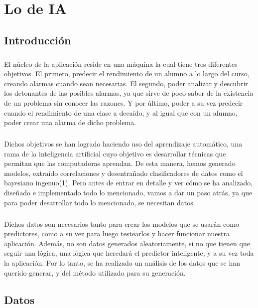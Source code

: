 \chapter{Lo de IA}

\section{Introducción}
\paragraph{}
El núcleo de la aplicación reside en una máquina la cual tiene tres
diferentes objetivos. El primero, predecir el rendimiento de un alumno
a lo largo del curso, creando alarmas cuando sean necesarias. El
segundo, poder analizar y descubrir los detonantes de las posibles
alarmas, ya que sirve de poco saber de la existencia de un problema
sin conocer las razones. Y por último, poder a su vez predecir cuando
el rendimiento de una clase a decaído, y al igual que con un alumno,
poder crear una alarma de dicho problema.
\paragraph{}
Dichos objetivos se han logrado haciendo uso del aprendizaje
automático, una rama de la inteligencia artificial cuyo objetivo es
desarrollar técnicas que permitan que las computadoras aprendan. De
esta manera, hemos generado modelos, extraído correlaciones y
desentrañado clasificadores de datos como el bayesiano
ingenuo(1). Pero antes de entrar en detalle y ver cómo se ha
analizado, diseñado e implementado todo lo mencionado, vamos a dar un
paso atrás, ya que para poder desarrollar todo lo mencionado, se
necesitan datos.
\paragraph{}
Dichos datos son necesarios tanto para crear los modelos que se usarán
como predictores, como a su vez para luego testearlos y hacer
funcionar nuestra aplicación. Además, no son datos generados
aleatoriamente, si no que tienen que seguir una lógica, una lógica que
heredará el predictor inteligente, y a su vez toda la aplicación. Por
lo tanto, se ha realizado un análisis de los datos que se han querido
generar, y del método utilizado para su generación.

\section{Datos}
